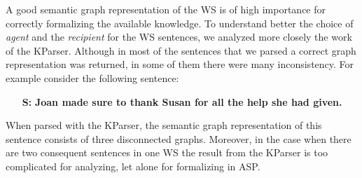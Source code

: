 A good semantic graph representation of the WS is of high importance for correctly formalizing the available knowledge. To understand better the choice of \textit{agent} and the \textit{recipient} for the WS sentences, we analyzed more closely the work of the KParser. Although in most of the sentences that we parsed a correct graph representation was returned, in some of them there were many inconsistency. For example consider the following sentence:
\begin{itemize}
	\item[\textbf{S:}] \textbf{Joan made sure to thank Susan for all the help she had given.}
\end{itemize}

When parsed with the KParser, the semantic graph representation of this sentence consists of three disconnected graphs. Moreover, in the case when there are two consequent sentences in one WS the result from the KParser is too complicated for analyzing, let alone for formalizing in ASP. 



